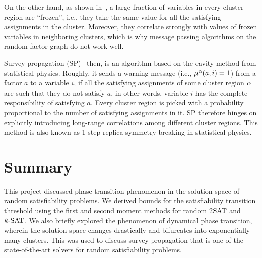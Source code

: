 \documentclass[letterpaper, 10pt, twocolumn, reqno]{amsart}
\begin{document}
On the other hand, as shown in~\cite{achlioptas2006solution}, a large fraction of variables in every cluster region are ``frozen'', i.e., they take the same value for all the satisfying assignments in the cluster. Moreover, they correlate strongly with values of frozen variables in neighboring clusters, which is why message passing algorithms on the random factor graph do not work well.

Survey propagation (SP)~\cite{braunstein2005survey} then, is an algorithm based on the cavity method from statistical physics. Roughly, it sends a warning message (i.e., $\mu^\alpha(a, i) = 1$) from a factor $a$ to a variable $i$, if all the satisfying assignments of some cluster region $\alpha$ are such that they do not satisfy $a$, in other words, variable $i$ has the complete responsibility of satisfying $a$. Every cluster region is picked with a probability proportional to the number of satisfying assignments in it. SP therefore hinges on explicitly introducing long-range correlations among different cluster regions. This method is also known as 1-step replica symmetry breaking in statistical physics.

\section{Summary}
\label{sec:summary}

This project discussed phase transition phenomenon in the solution space of random satisfiability problems. We derived bounds for the satisfiability transition threshold using the first and second moment methods for random 2$\textrm{SAT}$ and $k\textrm{-SAT}$. We also briefly explored the phenomenon of dynamical phase transition, wherein the solution space changes drastically and bifurcates into exponentially many clusters. This was used to discuss survey propagation that is one of the state-of-the-art solvers for random satisfiability problems.


{
\small


}
\end{document}
